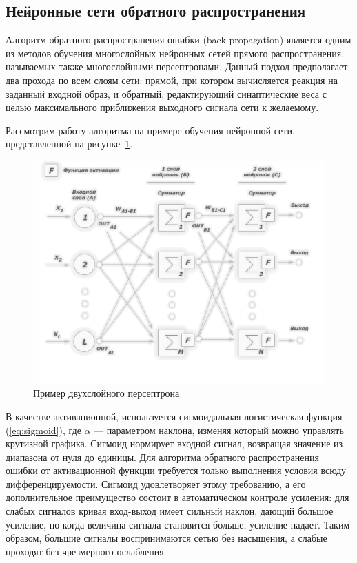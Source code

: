 \documentclass[a4paper,14pt]{extarticle} %
\begin{document}
\subsection{Нейронные сети обратного распространения}\label{sec:backprop}
\hspace{\parindent} Алгоритм обратного распространения ошибки (back propagation) является одним из методов обучения многослойных нейронных сетей прямого распространения, называемых также многослойными персептронами. Данный подход предполагает два прохода по всем слоям сети: прямой, при котором вычисляется реакция на заданный входной образ, и обратный, редактирующий синаптические веса с целью максимального приближения выходного сигнала сети к желаемому. 

Рассмотрим работу алгоритма на примере обучения нейронной сети, представленной на рисунке~\ref{fig:NN_multilayer_networks_01}.

\begin{figure}[h]
\centering
\includegraphics[width=0.75\linewidth]{NN_multilayer_networks_01}
\caption{Пример двухслойного персептрона}
\label{fig:NN_multilayer_networks_01}
\end{figure}

В качестве активационной, используется сигмоидальная логистическая функция (\ref{eq:sigmoid}), где $\alpha$ --- параметром наклона, изменяя который можно управлять крутизной графика. Сигмоид нормирует входной сигнал, возвращая значение из диапазона от нуля до единицы. Для алгоритма обратного распространения ошибки от активационной функции требуется только выполнения условия всюду дифференцируемости. Сигмоид удовлетворяет этому требованию, а его дополнительное преимущество состоит в автоматическом контроле усиления: для слабых сигналов кривая вход-выход имеет сильный наклон, дающий большое усиление, но когда величина сигнала становится больше, усиление падает. Таким образом, большие сигналы воспринимаются сетью без насыщения, а слабые проходят без чрезмерного ослабления. 
\end{document}
